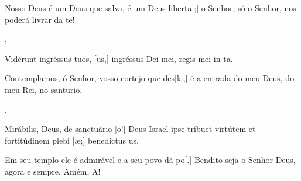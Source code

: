 {    {\item {}Nosso Deus é um Deus que salva, é um Deus liberta[;] o Senhor, só o Senhor, nos poderá livrar da te!~\Responsorium},
  {\item {}Vidérunt ingréssus tuos, [us,] ingréssus Dei mei, regis mei in ta.~\Responsorium}%
    {\item {}Contemplamos, ó Senhor, vosso cortejo que des[\-la,] é a entrada do meu Deus, do meu Rei, no santurio.~\Responsorium},
  {\item {}Mirábilis, Deus, de sanctuário [o!] Deus Israel ipse tríbuet virtútem et fortitúdinem plebi [æ;] benedíctus us.~\Responsorium}%
    {\item {}Em seu templo ele é admirável e a seu povo dá po[.] Bendito seja o Senhor Deus, agora e sempre. Amém, A!~\Responsorium}
}